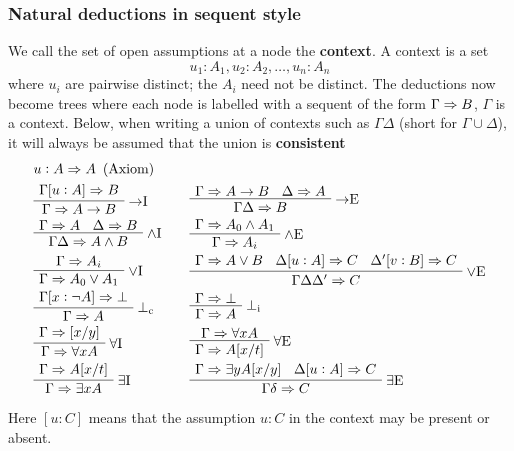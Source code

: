 \documentclass[11pt]{article}
\def \EBA {\EnableBpAbbreviations}
\def \RL[#1]{\RightLabel{#1}}
\begin{document}
\subsubsection{Natural deductions in sequent style}
\label{sec:orgbc80d9a}
We call the set of open assumptions at a node the \textbf{context}. A context is a set
\begin{equation*}
u_1:A_1,u_2:A_2,\dots,u_n:A_n
\end{equation*}
where \(u_i\) are pairwise distinct; the \(A_i\) need not be distinct. The
deductions now become trees where each node is labelled with a sequent of the
form \(\Gamma\Rightarrow B\), \(\Gamma\) is a context. Below, when writing a union of
contexts such as \(\Gamma\Delta\) (short for \(\Gamma\cup\Delta\)), it will
always be assumed that the union is \textbf{consistent}
\begin{alignat*}{2}
&u:A\Ra A\e(\text{Axiom})&&\\
&\AxiomC{$\Gamma[u:A]\Ra B$}\RightLabel{$\to$I}
\UnaryInfC{$\Gamma\Ra A\to B$}\DisplayProof&&
\AxiomC{$\Gamma\Ra A\to B$}
\AxiomC{$\Delta\Ra A$}\RightLabel{$\to$E}\BinaryInfC{$\Gamma\Delta\Ra B$}
\DisplayProof\\
&\AxiomC{$\Gamma\Ra A$}\AxiomC{$\Delta\Ra B$}\RightLabel{$\wedge$I}
\BinaryInfC{$\Gamma\Delta\Ra A\wedge B$}\DisplayProof\quad&&
\AxiomC{$\Gamma\Ra A_0\wedge A_1$}\RightLabel{$\wedge$E}
\UnaryInfC{$\Gamma\Ra A_i$}\DisplayProof\\
&\AxiomC{$\Gamma\Ra A_i$}\RightLabel{$\vee$I}
\UnaryInfC{$\Gamma\Ra A_0\vee A_1$}\DisplayProof&&
\def\defaultHypSeparation{\hskip 1pt}
\AxiomC{$\Gamma\Ra A\vee B$}
\AxiomC{$\Delta[u:A]\Ra C$}
\AxiomC{$\Delta'[v:B]\Ra C$}
\RightLabel{$\vee$E}
\TrinaryInfC{$\Gamma\Delta\Delta'\Ra C$}\DisplayProof\\
&\AxiomC{$\Gamma[x:\neg A]\Ra\bot$}\RightLabel{$\bot_\text{c}$}
\UnaryInfC{$\Gamma\Ra A$}\DisplayProof&&
\AxiomC{$\Gamma\Ra\bot$}\RightLabel{$\bot_{\text{i}}$}
\UnaryInfC{$\Gamma\Ra A$}\DisplayProof\\
&\EBA\AXC{$\Gamma\Ra[x/y]$}
\RightLabel{$\forall$I}
\UIC{$\Gamma\Ra\forall xA$}\DP&&\EBA
\AXC{$\Gamma\Ra\forall xA$}\RL{$\forall$E}
\UIC{$\Gamma\Ra A[x/t]$}\DP\\
&\EBA\AXC{$\Gamma\Ra A[x/t]$}
\RL{$\exists$I}\UIC{$\Gamma\Ra\exists xA$}\DP&&
\EBA\AXC{$\Gamma\Ra\exists yA[x/y]$}
\AXC{$\Delta[u:A]\Ra C$}\RL{$\exists$E}
\BIC{$\Gamma\delta\Ra C$}\DP
\end{alignat*}

Here \([u:C]\) means that the assumption \(u:C\) in the context may be present or
absent.
\end{document}
